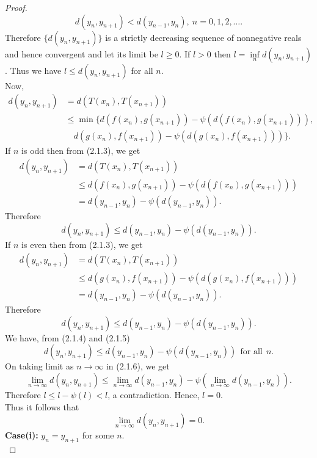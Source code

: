 \documentclass[10pt,a4paper]{amsart}
\begin{document}
\begin{proof}
\[d(y_{n},y_{n+1})<d(y_{n-1},y_{n}),\ n=0,1,2,\ldots.\]
Therefore $\{d(y_{n},y_{n+1})\}$ is a strictly decreasing sequence of nonnegative reals and hence convergent and let its limit be $l\geq 0$.
If $l>0$ then $l=\inf\limits_{n}d(y_{n},y_{n+1})$.
Thus we have $l\leq d(y_{n},y_{n+1})$ for all $n$.\\
Now,
\begin{align}
d(y_{n},y_{n+1}) &= d(T(x_{n}),T(x_{n+1})) \nonumber \\
&\leq \min\{d(f(x_{n}),g(x_{n+1}))-\psi(d(f(x_{n}),g(x_{n+1}))), \nonumber \\
&\quad d(g(x_{n}),f(x_{n+1}))-\psi(d(g(x_{n}),f(x_{n+1})))\}.
\end{align}
If $n$ is odd then from (2.1.3), we get
\begin{align}
d(y_{n},y_{n+1}) &= d(T(x_{n}),T(x_{n+1})) \nonumber \\
&\leq d(f(x_{n}),g(x_{n+1}))-\psi(d(f(x_{n}),g(x_{n+1}))) \nonumber \\
&= d(y_{n-1},y_{n})-\psi(d(y_{n-1},y_{n})).\nonumber
\end{align}
Therefore
\begin{equation}
    d(y_{n},y_{n+1})\leq d(y_{n-1},y_{n})-\psi(d(y_{n-1},y_{n})).
\end{equation}
If $n$ is even then from (2.1.3), we get
\begin{align}
d(y_{n},y_{n+1}) &= d(T(x_{n}),T(x_{n+1})) \nonumber \\
&\leq d(g(x_{n}),f(x_{n+1}))-\psi(d(g(x_{n}),f(x_{n+1}))) \nonumber \\
&= d(y_{n-1},y_{n})-\psi(d(y_{n-1},y_{n})).\nonumber
\end{align}
Therefore
\begin{equation}
    d(y_{n},y_{n+1})\leq d(y_{n-1},y_{n})-\psi(d(y_{n-1},y_{n})).
\end{equation}
We have, from (2.1.4) and (2.1.5)
\begin{equation}
d(y_{n},y_{n+1})\leq d(y_{n-1},y_{n})-\psi(d(y_{n-1},y_{n}))\ \ \text{for all}\ \ n.
\end{equation}
On taking limit as $n\to\infty$ in (2.1.6), we get
\[
\lim\limits_{n\to\infty}d(y_{n},y_{n+1})\leq\lim\limits_{n\to\infty}d(y_{n-1},y_{n})-\psi(\lim\limits_{n\to\infty}d(y_{n-1},y_{n})).
\]
Therefore $l\leq l-\psi(l)<l$, a contradiction.
Hence, $l=0$.\\
Thus it follows that
\[
\lim_{n\to\infty}d(y_n, y_{n+1}) = 0.
\]
\textbf{Case(i):}  $y_n = y_{n+1}$ for some $n$.\\

\end{proof}
\end{document}
